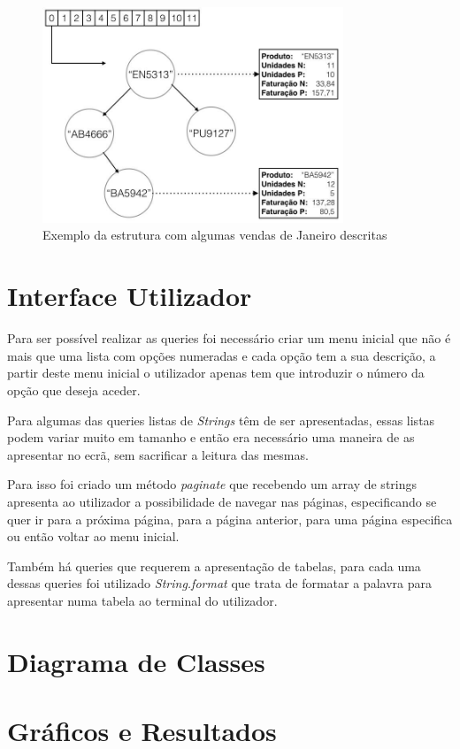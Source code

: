\documentclass[10pt] {article}
\begin{document}
\begin{figure}[ht!]
\centering
\includegraphics[width=90mm]{accounting.jpg}
\caption{Exemplo da estrutura com algumas vendas de Janeiro descritas}
\label{fig:sales}
\end{figure}

\newpage
\section{Interface Utilizador}

Para ser possível realizar as queries foi necessário criar um menu inicial que não é mais que uma lista com opções numeradas e cada opção tem a sua descrição, a partir deste menu inicial o utilizador apenas tem que introduzir o número da opção que deseja aceder.

Para algumas das queries listas de \emph{Strings} têm de ser apresentadas, essas listas podem variar muito  em tamanho e então era necessário uma maneira de as apresentar no ecrã, sem sacrificar a leitura das mesmas.

Para isso foi criado um método \emph{paginate} que recebendo um array de strings apresenta ao utilizador a possibilidade de navegar nas páginas, especificando se quer ir para a próxima página, para a página anterior, para uma página especifica ou então voltar ao menu inicial.

Também há queries que requerem a apresentação de tabelas, para cada uma dessas queries foi utilizado \emph{String.format} que trata de formatar a palavra para apresentar numa tabela ao terminal do utilizador.
\newpage
\section{Diagrama de Classes}

\newpage
\section{Gráficos e Resultados}
\end{document}
